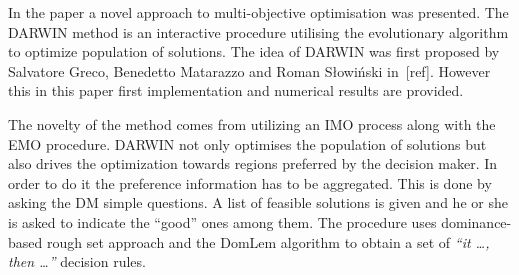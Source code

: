 In the paper a novel approach to multi-objective optimisation was
presented. The DARWIN method is an interactive procedure utilising the
evolutionary algorithm to optimize population of solutions. The idea of DARWIN
was first proposed by Salvatore Greco, Benedetto Matarazzo and Roman Słowiński
in~[ref]. However this in this paper first implementation and numerical
results are provided.

The novelty of the method comes from utilizing an IMO process along with the
EMO procedure. DARWIN not only optimises the population of solutions but also
drives the optimization towards regions preferred by the decision maker. In
order to do it the preference information has to be aggregated. This is done
by asking the DM simple questions. A list of feasible solutions is given and
he or she is asked to indicate the ``good'' ones among them. The procedure
uses dominance-based rough set approach and the DomLem algorithm to obtain a
set of \textit{``it \dots, then \dots''} decision rules. 
